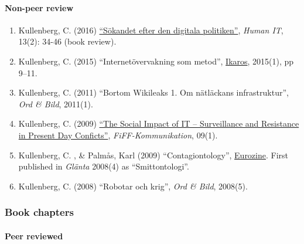 \documentclass[
]{article}
\providecommand{\tightlist}{%
  \setlength{\itemsep}{0pt}\setlength{\parskip}{0pt}}
\begin{document}
\hypertarget{non-peer-review}{%
\paragraph{Non-peer review}\label{non-peer-review}}

\begin{enumerate}
\def\labelenumi{\arabic{enumi}.}
\tightlist
\item
  Kullenberg, C. (2016)
  \href{https://humanit.hb.se/article/view/504/572}{``Sökandet efter den
  digitala politiken''}, \emph{Human IT}, 13(2): 34-46 (book review).
\item
  Kullenberg, C. (2015) ``Internetövervakning som metod'',
  \href{http://gup.ub.gu.se/records/fulltext/220443/220443.pdf}{Ikaros},
  2015(1), pp 9--11.
\item
  Kullenberg, C. (2011) ``Bortom Wikileaks 1. Om nätläckans
  infrastruktur'', \emph{Ord \& Bild}, 2011(1).
\item
  Kullenberg, C. (2009)
  \href{http://www.fiff.de/publikationen/fiff-kommunikation/fk-2009/fiff-ko-1-2009/fiko_1_2009_kullenberg.pdf}{``The
  Social Impact of IT -- Surveillance and Resistance in Present Day
  Conficts''}, \emph{FiFF-Kommunikation}, 09(1).
\item
  Kullenberg, C. , \& Palmås, Karl (2009) ``Contagiontology'',
  \href{http://www.eurozine.com/articles/2009-03-09-kullenberg-en.html}{Eurozine}.
  First published in \emph{Glänta} 2008(4) as ``Smittontologi''.
\item
  Kullenberg, C. (2008) ``Robotar och krig'', \emph{Ord \& Bild},
  2008(5).
\end{enumerate}

\hypertarget{book-chapters}{%
\subsubsection{Book chapters}\label{book-chapters}}

\hypertarget{peer-reviewed-1}{%
\paragraph{Peer reviewed}\label{peer-reviewed-1}}
\end{document}
